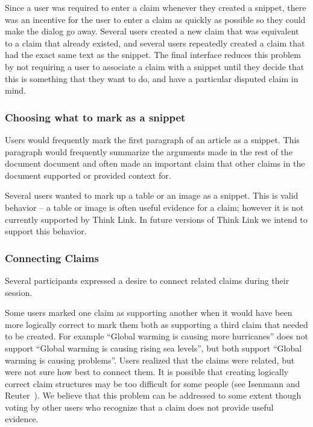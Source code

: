 \documentclass{chi2009}
\newcommand{\todo}[1]{}
\begin{document}
Since a user was required to enter a claim whenever they created a snippet, there was an incentive for the user to enter a claim as quickly as possible so they could make the dialog go away. 
Several users created a new claim that was equivalent to a claim that already existed, and several users repeatedly created a claim that had the exact same text as the snippet. The final interface reduces this problem by not requiring a user to associate a claim with a snippet until they decide that this is something that they want to do, and have a particular disputed claim in mind.

\todo{Need to do some kind of evaluation to show that the new interface solves these problems}


\subsubsection{Choosing what to mark as a snippet}

Users would frequently mark the first paragraph of an article as a snippet. This paragraph would frequently summarize the arguments made in the rest of the document document and often made an important claim that other claims in the document supported or provided context for. 

Several users wanted to mark up a table or an image as a snippet. This is valid behavior -- a table or image is often useful evidence for a claim; however it is not currently supported by Think Link. In future versions of Think Link we intend to support this behavior.


\subsubsection{Connecting Claims}

Several participants expressed a desire to connect related claims during their session. 

Some users marked one claim as supporting another when it would have been more logically correct to mark them both as supporting a third claim that needed to be created. For example ``Global warming is causing more hurricanes'' does not support ``Global warming is causing rising sea levels'', but both support ``Global warming is causing problems''. Users realized that the claims were related, but were not sure how best to connect them. It is possible that creating logically correct claim structures may be too difficult for some people (see Isenmann and Reuter~\cite{Isenmann1997}). We believe that this problem can be addressed to some extent though voting by other users who recognize that a claim does not provide useful evidence. 
\end{document}
